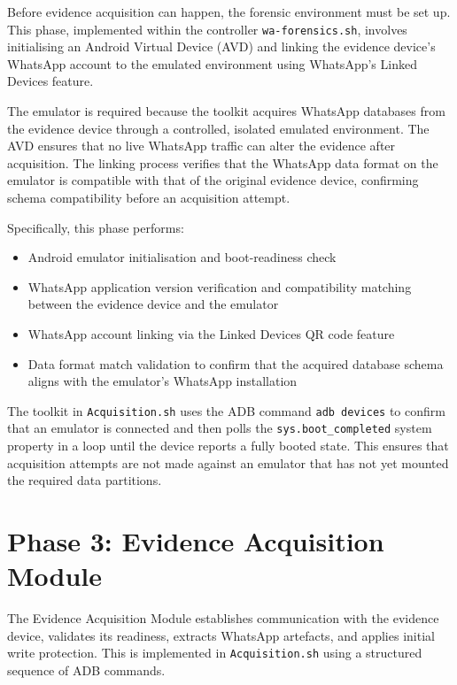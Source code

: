 \documentclass[12pt,a4paper]{report}
\begin{document}
Before evidence acquisition can happen, the forensic environment must be set up. This phase, implemented within the controller \texttt{wa-forensics.sh}, involves initialising an Android Virtual Device (AVD) and linking the evidence device's WhatsApp account to the emulated environment using WhatsApp's Linked Devices feature.

The emulator is required because the toolkit acquires WhatsApp databases from the evidence device through a controlled, isolated emulated environment. The AVD ensures that no live WhatsApp traffic can alter the evidence after acquisition. The linking process verifies that the WhatsApp data format on the emulator is compatible with that of the original evidence device, confirming schema compatibility before an acquisition attempt.

Specifically, this phase performs:
\begin{itemize}
    \item Android emulator initialisation and boot-readiness check
    \item WhatsApp application version verification and compatibility matching between the evidence device and the emulator
    \item WhatsApp account linking via the Linked Devices QR code feature
    \item Data format match validation to confirm that the acquired database schema aligns with the emulator's WhatsApp installation
\end{itemize}

The toolkit in \texttt{Acquisition.sh} uses the ADB command \texttt{adb devices} to confirm that an emulator is connected and then polls the \texttt{sys.boot\_completed} system property in a loop until the device reports a fully booted state. This ensures that acquisition attempts are not made against an emulator that has not yet mounted the required data partitions.

\section{Phase 3: Evidence Acquisition Module}

The Evidence Acquisition Module establishes communication with the evidence device, validates its readiness, extracts WhatsApp artefacts, and applies initial write protection. This is implemented in \texttt{Acquisition.sh} using a structured sequence of ADB commands.
\end{document}
